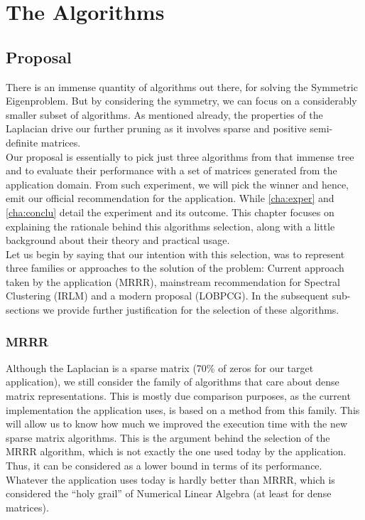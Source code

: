 \chapter{The Algorithms}
\label{cha:algs}

\section{Proposal}
\label{sec:propo}
There is an immense quantity of algorithms out there, for solving the
Symmetric Eigenproblem. But by considering the symmetry, we can focus
on a considerably smaller subset of algorithms. As mentioned already,
the properties of the Laplacian drive 
our further pruning as it involves sparse and positive semi-definite 
matrices. \\

Our proposal is essentially to pick just three algorithms from that
immense tree and to evaluate their performance with a set of matrices
generated from the application domain. From such experiment, we will
pick the winner and hence, emit our official recommendation for the
application. While \cref{cha:exper} and \cref{cha:conclu} detail the
experiment and its outcome. This chapter focuses on explaining the
rationale behind this algorithms selection, along with a little
background about their theory and practical usage. \\

Let us begin by saying that our intention with this selection, was to
represent three families or approaches to the solution of the problem:
Current approach taken by the application (\gls{MRRR}), mainstream
recommendation for Spectral Clustering (\gls{IRLM}) and a modern
 proposal (\gls{LOBPCG}). In the subsequent sub-sections we provide
further justification for the selection of these algorithms.

\subsection{\gls{MRRR}}
Although the \gls{Laplacian} is a sparse matrix (70\% of zeros for our
target application), we still consider the family of algorithms that
care about dense matrix representations. This is mostly due comparison
purposes, as the current implementation the application uses, is
based on a method from this family. This will allow us to know how
much we improved the execution time with the new sparse matrix
algorithms. This is the argument behind the selection of the
\gls{MRRR} algorithm, which is not exactly the one used today by the
application. Thus, it can be considered as a lower bound in terms of its
performance. Whatever the application uses today is hardly better than
\gls{MRRR}, which is considered the ``holy grail'' of Numerical Linear
Algebra \cite{hogben06} (at least for dense matrices).\\ 

